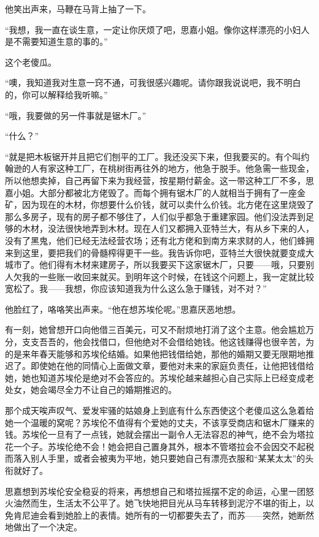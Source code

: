 \par 他笑出声来，马鞭在马背上抽了一下。
\par “我想，我一直在谈生意，一定让你厌烦了吧，思嘉小姐。像你这样漂亮的小妇人是不需要知道生意的事的。”
\par 这个老傻瓜。
\par “噢，我知道我对生意一窍不通，可我很感兴趣呢。请你跟我说说吧，我不明白的，你可以解释给我听嘛。”
\par “哦，我要做的另一件事就是锯木厂。”
\par “什么？”
\par “就是把木板锯开并且把它们刨平的工厂。我还没买下来，但我要买的。有个叫约翰逊的人有家这种工厂，在桃树街再往外的地方，他急于脱手。他急需一些现金，所以他想卖掉，自己再留下来为我经营，按星期付薪金。这一带这种工厂不多，思嘉小姐。大部分都被北方佬毁了。而每个拥有锯木厂的人就相当于拥有了一座金矿，因为现在的木材，你想要什么价钱，就可以卖什么价钱。北方佬在这里烧毁了那么多房子，现有的房子都不够住了，人们似乎都急于重建家园。他们没法弄到足够的木材，没法很快地弄到木材。现在人们又都拥入亚特兰大，有从乡下来的人，没有了黑鬼，他们已经无法经营农场；还有北方佬和到南方来求财的人，他们蜂拥来到这里，要把我们的骨髓榨得更干一些。我告诉你吧，亚特兰大很快就要变成大城市了。他们得有木材来建房子，所以我要买下这家锯木厂，只要——哦，只要别人欠我的一些账一收回来就买。到明年这个时候，在钱这个问题上，我一定就比较宽松了。我——我想，你应该知道我为什么这么急于赚钱，对不对？”
\par 他脸红了，咯咯笑出声来。“他在想苏埃伦呢。”思嘉厌恶地想。
\par 有一刻，她曾想开口向他借三百美元，可又不耐烦地打消了这个主意。他会尴尬万分，支支吾吾的，他会找借口，但他绝对不会借给她钱。他这钱赚得也很辛苦，为的是来年春天能够和苏埃伦结婚。如果他把钱借给她，那他的婚期又要无限期地推迟了。即使她在他的同情心上面做文章，要他对未来的家庭负责任，让他把钱借给她，她也知道苏埃伦是绝对不会答应的。苏埃伦越来越担心自己实际上已经变成老处女，她会竭尽全力不让自己的婚期推迟的。
\par 那个成天唉声叹气、爱发牢骚的姑娘身上到底有什么东西使这个老傻瓜这么急着给她一个温暖的窝呢？苏埃伦不值得有个爱她的丈夫，不该享受商店和锯木厂赚来的钱。苏埃伦一旦有了一点钱，她就会摆出一副令人无法容忍的神气，绝不会为塔拉花一个子。苏埃伦绝不会！她会把自己置身其外，根本不管塔拉会不会因交不起税而落入别人手里，或者会被夷为平地，她只要她自己有漂亮衣服和“某某太太”的头衔就好了。
\par 思嘉想到苏埃伦安全稳妥的将来，再想想自己和塔拉摇摆不定的命运，心里一团怒火油然而生，生活太不公平了。她飞快地把目光从马车转移到泥泞不堪的街上，以免肯尼迪会看到她脸上的表情。她所有的一切都要失去了，而苏——突然，她断然地做出了一个决定。
